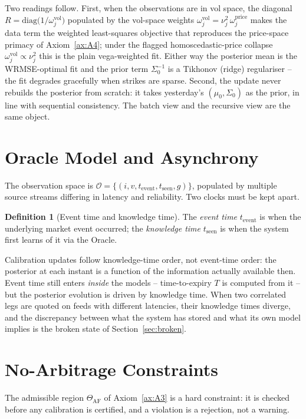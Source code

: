 \documentclass[11pt]{book}
\theoremstyle{plain}
\theoremstyle{definition}
\newtheorem{definition}[theorem]{Definition}
\theoremstyle{remark}
\newcommand{\vega}{\nu}                          %
\begin{document}
Two readings follow. First, when the observations are in vol space,
the diagonal $R=\mathrm{diag}\bigl(1/\omega_j^{\text{vol}}\bigr)$ populated by the
vol-space weights $\omega_j^{\text{vol}}=\vega_j^2\,\omega_j^{\text{price}}$ makes
the data term the weighted least-squares objective that reproduces the
price-space primacy of Axiom~\ref{ax:A4}; under the flagged homoscedastic-price
collapse $\omega_j^{\text{vol}}\propto\vega_j^2$ this is the plain vega-weighted
fit. Either way the posterior mean is the WRMSE-optimal fit and the prior term
$\Sigma_0^{-1}$ is a Tikhonov (ridge) regulariser -- the fit degrades gracefully
when strikes are sparse. Second, the update never rebuilds the
posterior from scratch: it takes yesterday's $(\mu_0,\Sigma_0)$ as the prior, in
line with sequential consistency. The batch view and the recursive view are the
same object.

\section{Oracle Model and Asynchrony}

The observation space is
$\mathcal{O}=\{(i,v,t_{\text{event}},t_{\text{seen}},g)\}$, populated by multiple
source streams differing in latency and reliability. Two clocks must be kept
apart.

\begin{definition}[Event time and knowledge time]
The \emph{event time} $t_{\text{event}}$ is when the underlying market event
occurred; the \emph{knowledge time} $t_{\text{seen}}$ is when the system first
learns of it via the Oracle.
\end{definition}

Calibration updates follow knowledge-time order, not event-time order: the
posterior at each instant is a function of the information actually available
then. Event time still enters \emph{inside} the models -- time-to-expiry $T$ is
computed from it -- but the posterior evolution is driven by knowledge time. When
two correlated legs are quoted on feeds with different latencies, their knowledge
times diverge, and the discrepancy between what the system has stored and what
its own model implies is the broken state of Section~\ref{sec:broken}.

\section{No-Arbitrage Constraints}
\label{sec:noarb}

The admissible region $\Theta_{\mathrm{AF}}$ of Axiom~\ref{ax:A3} is a hard
constraint: it is checked before any calibration is certified, and a violation is
a rejection, not a warning.
\end{document}
